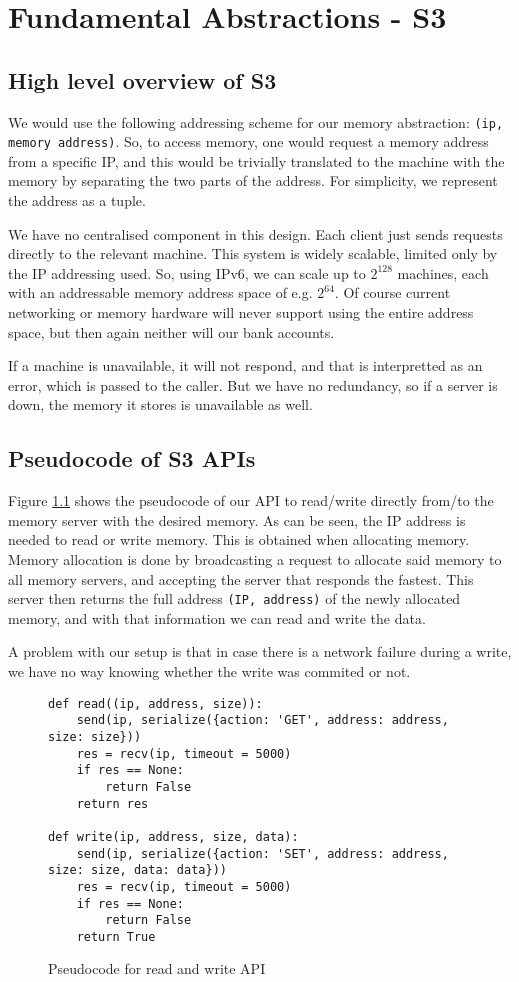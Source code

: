 \chapter{Fundamental Abstractions - S3}

\section{High level overview of S3}
We would use the following addressing scheme for our memory
abstraction: \texttt{(ip, memory address)}. So, to access memory, one
would request a memory address from a specific IP, and this would be
trivially translated to the machine with the memory by separating the
two parts of the address. For simplicity, we represent the address as
a tuple.

We have no centralised component in this design. Each client just
sends requests directly to the relevant machine. This system is widely
scalable, limited only by the IP addressing used. So, using IPv6, we
can scale up to $2^{128}$ machines, each with an addressable memory
address space of e.g. $2^{64}$. Of course current networking or memory
hardware will never support using the entire address space, but then
again neither will our bank accounts.

If a machine is unavailable, it will not respond, and that is
interpretted as an error, which is passed to the caller. But we have
no redundancy, so if a server is down, the memory it stores is
unavailable as well.


\section{Pseudocode of S3 APIs}
Figure \ref{pseudocode} shows the pseudocode of our API to read/write
directly from/to the memory server with the desired memory. As can be
seen, the IP address is needed to read or write memory. This is
obtained when allocating memory. Memory allocation is done by
broadcasting a request to allocate said memory to all memory servers,
and accepting the server that responds the fastest. This server then
returns the full address \texttt{(IP, address)} of the newly allocated
memory, and with that information we can read and write the data.

A problem with our setup is that in case there is a network failure
during a write, we have no way knowing whether the write was commited
or not.

\begin{figure}
\begin{verbatim}
def read((ip, address, size)):
    send(ip, serialize({action: 'GET', address: address, size: size}))
    res = recv(ip, timeout = 5000)
    if res == None:
        return False
    return res

def write(ip, address, size, data):
    send(ip, serialize({action: 'SET', address: address, size: size, data: data}))
    res = recv(ip, timeout = 5000)
    if res == None:
        return False
    return True
\end{verbatim}
\caption{Pseudocode for read and write API \label{pseudocode}}
\end{figure}

